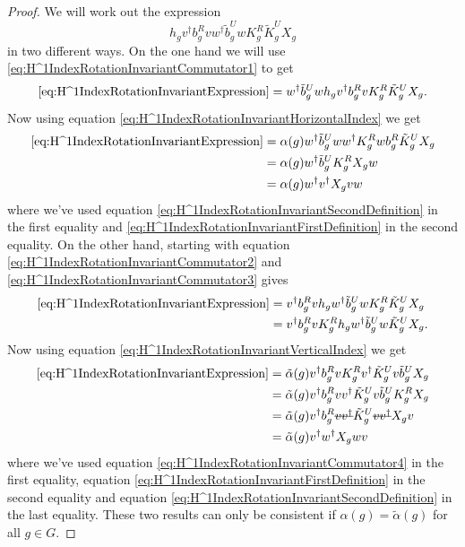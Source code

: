 \documentclass[12pt,a4paper,twoside]{article}
\newcommand{\stkout}[1]{\ifmmode\text{\sout{\ensuremath{#1}}}\else\sout{#1}\fi}
\theoremstyle{definition}
\numberwithin{equation}{section}
\begin{document}
\begin{proof}
	We will work out the expression
	\begin{equation}\label{eq:H^1IndexRotationInvariantExpression}
		h_g v^\dagger b_g^R v w^\dagger\tilde{b}_g^U w K_g^R\tilde{K}_g^U X_g
	\end{equation}
	in two different ways. On the one hand we will use \eqref{eq:H^1IndexRotationInvariantCommutator1} to get
	\begin{equation}
		\eqref{eq:H^1IndexRotationInvariantExpression}= w^\dagger\tilde{b}_g^U w h_g v^\dagger b_g^R v K_g^R\tilde{K}_g^U X_g.
	\end{equation}
	Now using equation \eqref{eq:H^1IndexRotationInvariantHorizontalIndex} we get
	\begin{align}
		\eqref{eq:H^1IndexRotationInvariantExpression}&=\alpha(g)w^\dagger\tilde{b}_g^U w w^\dagger K_g^R w b_g^R\tilde{K}_g^U X_g\\
		&=\alpha(g)w^\dagger\tilde{b}_g^U  K_g^R X_g w\\
		&=\alpha(g)w^\dagger v^\dagger X_g v w
	\end{align}
	where we've used equation \eqref{eq:H^1IndexRotationInvariantSecondDefinition} in the first equality and \eqref{eq:H^1IndexRotationInvariantFirstDefinition} in the second equality. On the other hand, starting with equation \eqref{eq:H^1IndexRotationInvariantCommutator2} and \eqref{eq:H^1IndexRotationInvariantCommutator3} gives
	\begin{align}
		\eqref{eq:H^1IndexRotationInvariantExpression}&= v^\dagger b_g^R v h_g w^\dagger\tilde{b}_g^U w K_g^R\tilde{K}_g^U X_g\\
		&=v^\dagger b_g^R v K_g^R h_g w^\dagger\tilde{b}_g^U w \tilde{K}_g^U X_g.
	\end{align}
	Now using equation \eqref{eq:H^1IndexRotationInvariantVerticalIndex} we get
	\begin{align}
		\eqref{eq:H^1IndexRotationInvariantExpression}&=\tilde{\alpha}(g)v^\dagger b_g^R v K_g^R v^\dagger \tilde{K}_g^U v \tilde{b}_g^U X_g\\
		&=\tilde{\alpha}(g)v^\dagger b_g^R v v^\dagger \tilde{K}_g^U v \tilde{b}_g^U K_g^R X_g\\
		&=\tilde{\alpha}(g)v^\dagger b_g^R \stkout{v v^\dagger} \tilde{K}_g^U \stkout{v v^\dagger} X_g v\\
		&=\tilde{\alpha}(g) v^\dagger w^\dagger X_g w v
	\end{align}
	where we've used equation \eqref{eq:H^1IndexRotationInvariantCommutator4} in the first equality, equation \eqref{eq:H^1IndexRotationInvariantFirstDefinition} in the second equality and equation \eqref{eq:H^1IndexRotationInvariantSecondDefinition} in the last equality. These two results can only be consistent if $\alpha(g)=\tilde{\alpha}(g)$ for all $g\in G$.
\end{proof}
\end{document}
